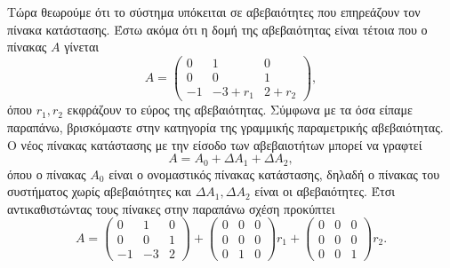 Τώρα θεωρούμε ότι το σύστημα υπόκειται σε αβεβαιότητες που επηρεάζουν τον πίνακα
κατάστασης. Έστω ακόμα ότι η δομή της αβεβαιότητας είναι τέτοια που ο πίνακας
\( A \) γίνεται
\[
    A =
    \begin{pmatrix}
        0 & 1 & 0 \\
        0 & 0 & 1 \\
        -1 & -3 + r_1 & 2 + r_2
    \end{pmatrix},
\]
όπου \( r_1, r_2 \) εκφράζουν το εύρος της αβεβαιότητας. Σύμφωνα με τα όσα
είπαμε παραπάνω, βρισκόμαστε στην κατηγορία της γραμμικής παραμετρικής
αβεβαιότητας. Ο νέος πίνακας κατάστασης με την είσοδο των αβεβαιοτήτων μπορεί
να γραφτεί
\[
    A = A_0 + \Delta A_1 + \Delta A_2,
\]
όπου ο πίνακας \( A_0 \) είναι ο ονομαστικός πίνακας κατάστασης, δηλαδή ο
πίνακας του συστήματος χωρίς αβεβαιότητες και \( \Delta A_1, \Delta A_2 \) είναι
οι αβεβαιότητες. Έτσι αντικαθιστώντας τους πίνακες στην παραπάνω σχέση προκύπτει
\[
    A =
    \begin{pmatrix}
        0 & 1 & 0 \\
        0 & 0 & 1 \\
        -1 & -3 & 2
    \end{pmatrix} +
    \begin{pmatrix}
        0 & 0 & 0 \\
        0 & 0 & 0 \\
        0 & 1 & 0
    \end{pmatrix}r_1 +
    \begin{pmatrix}
        0 & 0 & 0 \\
        0 & 0 & 0 \\
        0 & 0 & 1
    \end{pmatrix}r_2.
\]

